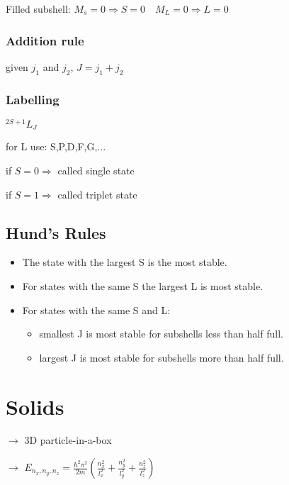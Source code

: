 \documentclass[10pt,a4paper]{scrartcl}
\begin{document}
\begin{multicols*}{3}
	Filled subshell: $M_s=0\Rightarrow S=0\quad M_L=0\Rightarrow L=0$	
	
	
	\subsubsection{Addition rule}
	
	given $j_1$ and $j_2$, $J=j_1+j_2$
	
	
	\subsubsection{Labelling}
	
	$^{2S+1}L_J$
	
	for L use: S,P,D,F,G,$\ldots$
	
	if $S=0\Rightarrow$ called single state
	
	if $S=1\Rightarrow$ called triplet state
	
	\subsection{Hund's Rules}
	\small
	\begin{itemize}
	\compaq
	\item
	The state with the largest S is the most stable.
	\item
	For states with the same S the largest L is most stable.
	\item
	For states with the same S and L:
	\begin{itemize}
	\compaq
	\item
	smallest J is most stable for subshells less than half full.
	\item
	largest J is most stable for subshells more than half full.
	\end{itemize}
	\end{itemize}
	\normalsize
	
	\section{Solids}
	
	$\rightarrow$ 3D particle-in-a-box 
	
	$\rightarrow$ $E_{n_x,n_y,n_z}=\frac{\hbar^2\pi^2}{2m}\left(\frac{n_x^2}{l_x^2}+\frac{n_y^2}{l_y^2}+\frac{n_z^2}{l_z^2}\right)$
	

\end{multicols*}
\end{document}
